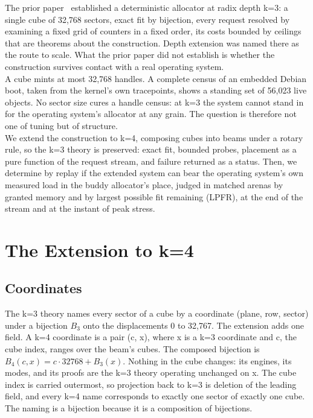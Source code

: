 \documentclass{article}
\begin{document}
The prior paper~\cite{fine2026iscandar} established a deterministic allocator at radix depth k=3: a single cube of 32,768 sectors, exact fit by bijection, every request resolved by examining a fixed grid of counters in a fixed order, its costs bounded by ceilings that are theorems about the construction. Depth extension was named there as the route to scale. What the prior paper did not establish is whether the construction survives contact with a real operating system.\\

A cube mints at most 32,768 handles. A complete census of an embedded Debian boot, taken from the kernel's own tracepoints, shows a standing set of 56,023 live objects. No sector size cures a handle census: at k=3 the system cannot stand in for the operating system's allocator at any grain. The question is therefore not one of tuning but of structure.\\

We extend the construction to k=4, composing cubes into beams under a rotary rule, so the k=3 theory is preserved: exact fit, bounded probes, placement as a pure function of the request stream, and failure returned as a status. Then, we determine by replay if the extended system can bear the operating system's own measured load in the buddy allocator's place, judged in matched arenas by granted memory and by largest possible fit remaining (LPFR), at the end of the stream and at the instant of peak stress.

\section{The Extension to k=4}

\subsection{Coordinates}

The k=3 theory names every sector of a cube by a coordinate (plane, row, sector) under a bijection $B_3$ onto the displacements 0 to 32,767. The extension adds one field. A k=4 coordinate is a pair (c, x), where x is a k=3 coordinate and c, the cube index, ranges over the beam's cubes. The composed bijection is $B_4(c, x) = c \cdot 32768 + B_3(x)$. Nothing in the cube changes: its engines, its modes, and its proofs are the k=3 theory operating unchanged on x. The cube index is carried outermost, so projection back to k=3 is deletion of the leading field, and every k=4 name corresponds to exactly one sector of exactly one cube. The naming is a bijection because it is a composition of bijections.
\end{document}
